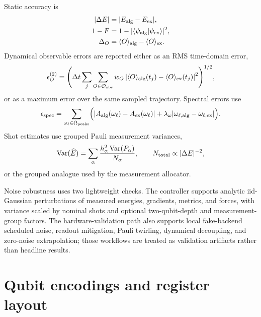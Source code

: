 \documentclass[
  reprint,
  amsmath,
  amssymb,
  aps,
  pra,
  nofootinbib,
  superscriptaddress,
  floatfix
]{revtex4-2}
\newcommand{\Ocal}{\mathcal{O}}
\newcommand{\ex}{\mathrm{ex}}
\newcommand{\obs}{\mathrm{obs}}
\newcommand{\Var}{\operatorname{Var}}
\newcommand{\braket}[2]{\langle #1|#2\rangle}
\newcommand{\expval}[1]{\langle #1\rangle}
\begin{document}
Static accuracy is
\begin{equation}
\begin{aligned}
|\Delta E|&=|E_{\rm alg}-E_{\ex}|,\\
1-F&=1-|\braket{\psi_{\rm alg}}{\psi_{\ex}}|^2,\\
\Delta_O&=\expval{O}_{\rm alg}-\expval{O}_{\ex}.
\end{aligned}
\label{eq:appendix_static_metrics}
\end{equation}
Dynamical observable errors are reported either as an RMS time-domain error,
\begin{equation}
\epsilon_{O}^{(2)}=
\Biggl(\Delta t\sum_{j}\sum_{O\in\Ocal_{\obs}}w_O
\left|\expval{O}_{\rm alg}(t_j)-\expval{O}_{\ex}(t_j)\right|^2\Biggr)^{1/2},
\label{eq:appendix_obs_l2}
\end{equation}
or as a maximum error over the same sampled trajectory. Spectral errors use
\begin{equation}
\epsilon_{\rm spec}=\sum_{\omega_{\ell}\in\Omega_{\rm peaks}}
\Bigl(|A_{\rm alg}(\omega_{\ell})-A_{\ex}(\omega_{\ell})|
+\lambda_{\omega}|\omega_{\ell,\rm alg}-\omega_{\ell,\ex}|\Bigr).
\label{eq:appendix_spectral_error}
\end{equation}
Shot estimates use grouped Pauli measurement variances,
\begin{equation}
\Var(\widehat E)=\sum_{\alpha}\frac{h_{\alpha}^2\Var(P_{\alpha})}{N_{\alpha}},
\qquad
N_{\rm total}\propto |\Delta E|^{-2},
\label{eq:appendix_shot_estimate}
\end{equation}
or the grouped analogue used by the measurement allocator.

Noise robustness uses two lightweight checks. The controller supports analytic iid-Gaussian perturbations of measured energies, gradients, metrics, and forces, with variance scaled by nominal shots and optional two-qubit-depth and measurement-group factors. The hardware-validation path also supports local fake-backend scheduled noise, readout mitigation, Pauli twirling, dynamical decoupling, and zero-noise extrapolation; those workflows are treated as validation artifacts rather than headline results.

\section{Qubit encodings and register layout}
\label{app:encodings}
\end{document}
